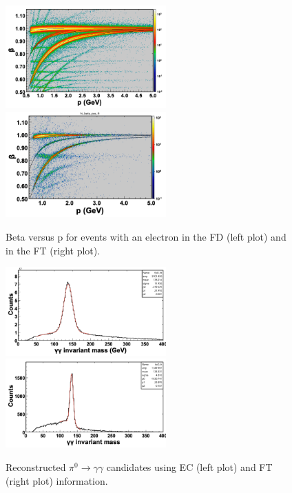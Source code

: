 \documentclass[3p,times,twocolumn]{elsarticle}
\begin{document}
\begin{figure}[ht]
\includegraphics[width=0.55\textwidth,natwidth=610,natheight=642]{pics/betavsp1.png}
\includegraphics[width=0.55\textwidth,natwidth=610,natheight=642]{pics/betavsp2.png}
\caption{Beta versus p for events with an electron in the FD (left plot) and in the FT (right plot).
}
\label{fig:betavsp}
\end{figure}

\begin{figure}[ht]
\includegraphics[width=0.55\textwidth,natwidth=610,natheight=642]{pics/pi0mass.png}
\includegraphics[width=0.55\textwidth,natwidth=610,natheight=642]{pics/pi0mass2.png}
\caption{Reconstructed $\pi^{0}\rightarrow \gamma \gamma$ candidates using EC (left plot) and FT (right plot) information.
}
\label{fig:pi0mass}
\end{figure}
\end{document}
